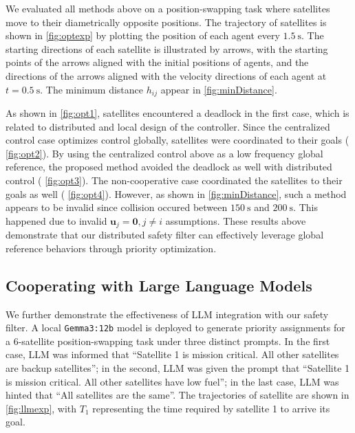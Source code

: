 \documentclass{ifacconf}
\begin{document}
\par We evaluated all methods above on a position-swapping task where satellites move to their diametrically opposite positions. The trajectory of satellites is shown in {\figurename} \ref{fig:optexp} by plotting the position of each agent every $1.5~\mathrm{s}$. The starting directions of each satellite is illustrated by arrows, with the starting points of the arrows aligned with the initial positions of agents, and the directions of the arrows aligned with the velocity directions of each agent at $t = 0.5~\mathrm{s}$.
The minimum distance $h_{ij}$ appear in {\figurename} \ref{fig:minDistance}.

\par As shown in {\figurename} \ref{fig:opt1}, satellites encountered a deadlock in the first case, which is related to distributed and local design of the controller.
Since the centralized control case optimizes control globally, satellites were coordinated to their goals ({\figurename} \ref{fig:opt2}).
By using the centralized control above as a low frequency global reference, the proposed method avoided the deadlock as well with distributed control ({\figurename} \ref{fig:opt3}).
The non-cooperative case coordinated the satellites to their goals as well ({\figurename} \ref{fig:opt4}). 
However, as shown in {\figurename} \ref{fig:minDistance}, such a method appears to be invalid since collision occured between $150~\mathrm{s}$ and $200~\mathrm{s}$.
This happened due to invalid $\boldsymbol{u}_j = \boldsymbol{0}, j \neq i$ assumptions.
These results above demonstrate that our distributed safety filter can effectively leverage global reference behaviors through priority optimization.

\subsection{Cooperating with Large Language Models}
\par We further demonstrate the effectiveness of LLM integration with our safety filter. A local \texttt{Gemma3:12b} \cite[]{gemma2024} model is deployed to generate priority assignments for a 6-satellite position-swapping task under three distinct prompts. 
In the first case, LLM was informed that ``Satellite 1 is mission critical. All other satellites are backup satellites''; 
in the second, LLM was given the prompt that ``Satellite 1 is mission critical. All other satellites have low fuel'';
in the last case, LLM was hinted that ``All satellites are the same''.
The trajectories of satellite are shown in {\figurename} \ref{fig:llmexp}, with $T_1$ representing the time required by satellite 1 to arrive its goal.
\end{document}
